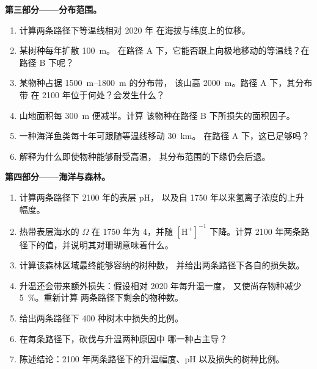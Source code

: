 \begin{problem}
\medskip
\noindent\textbf{第三部分——分布范围。}
\begin{enumerate}[resume]
  \item 计算两条路径下等温线相对 2020 年
        在海拔与纬度上的位移。
  \item 某树种每年扩散 \qty{100}{m}。
        在路径 A 下，它能否跟上向极地移动的等温线？在路径 B 下呢？
  \item 某物种占据 \qtyrange{1500}{1800}{m} 的分布带，
        该山高 \qty{2000}{m}。路径 A 下，其分布带
        在 2100 年位于何处？会发生什么？
  \item 山地面积每 \qty{300}{m} 便减半。计算
        该物种在路径 B 下所损失的面积因子。
  \item 一种海洋鱼类每十年可跟随等温线移动 \qty{30}{km}。
        在路径 A 下，这已足够吗？
  \item 解释为什么即使物种能够耐受高温，
        其分布范围的下缘仍会后退。
\end{enumerate}

\medskip
\noindent\textbf{第四部分——海洋与森林。}
\begin{enumerate}[resume]
  \item 计算两条路径下 2100 年的表层 pH，
        以及自 1750 年以来氢离子浓度的上升幅度。
  \item 热带表层海水的 $\Omega$ 在 1750 年为
        4，并随 $[\ensuremath{\mathrm{H^{+}}}]^{-1}$ 下降。计算
        2100 年两条路径下的值，并说明其对珊瑚意味着什么。
  \item 计算该森林区域最终能够容纳的树种数，
        并给出两条路径下各自的损失数。
  \item 升温还会带来额外损失：假设相对 2020 年每升温一度，
        又使尚存物种减少 \qty{5}{\%}。重新计算
        两条路径下剩余的物种数。
  \item 给出两条路径下 400 种树木中损失的比例。
  \item 在每条路径下，砍伐与升温两种原因中
        哪一种占主导？
  \item 陈述结论：2100 年两条路径下的升温幅度、pH
        以及损失的树种比例。
\end{enumerate}
\end{problem}
